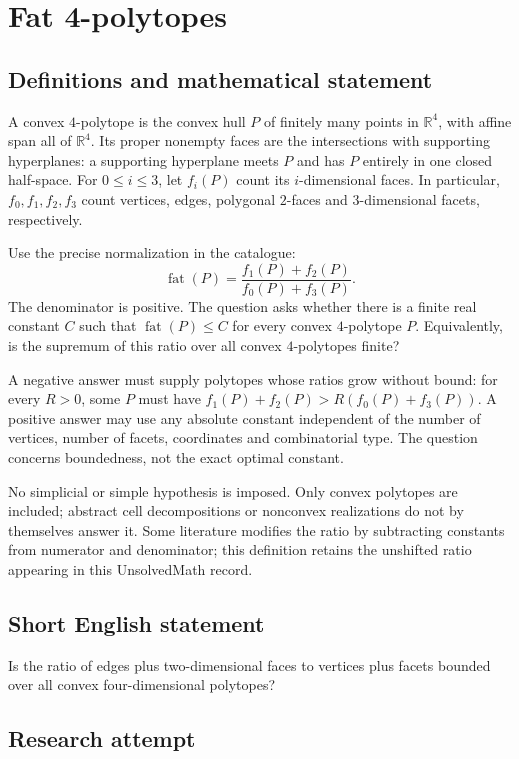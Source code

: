 \documentclass[11pt,a4paper]{article}
\begin{document}
\section*{Fat 4-polytopes}\label{statement}

\subsection{Definitions and mathematical statement}
A convex $4$-polytope is the convex hull $P$ of finitely many points in
$\mathbb R^4$, with affine span all of $\mathbb R^4$. Its proper nonempty
faces are the intersections with supporting hyperplanes: a supporting
hyperplane meets $P$ and has $P$ entirely in one closed half-space.
For $0\le i\le3$, let $f_i(P)$ count its $i$-dimensional faces.
In particular, $f_0,f_1,f_2,f_3$ count vertices, edges, polygonal
$2$-faces and $3$-dimensional facets, respectively.

Use the precise normalization in the catalogue:
\[
 \operatorname{fat}(P)=\frac{f_1(P)+f_2(P)}{f_0(P)+f_3(P)}.
\]
The denominator is positive. The question asks whether there is a
finite real constant $C$ such that $\operatorname{fat}(P)\le C$ for
every convex $4$-polytope $P$.
Equivalently, is the supremum of this ratio over all convex
$4$-polytopes finite?

A negative answer must supply polytopes whose ratios grow without bound:
for every $R>0$, some $P$ must have $f_1(P)+f_2(P)>R(f_0(P)+f_3(P))$.
A positive answer may use any absolute constant independent of the
number of vertices, number of facets, coordinates and combinatorial type.
The question concerns boundedness, not the exact optimal constant.

No simplicial or simple hypothesis is imposed. Only convex polytopes are
included; abstract cell decompositions or nonconvex realizations do not
by themselves answer it. Some literature modifies the ratio by subtracting
constants from numerator and denominator; this definition retains the
unshifted ratio appearing in this UnsolvedMath record.
\subsection{Short English statement}
Is the ratio of edges plus two-dimensional faces to vertices plus facets bounded over all convex four-dimensional polytopes?
\subsection{Research attempt}
\end{document}
